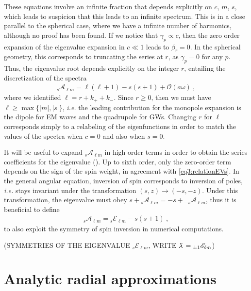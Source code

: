 These equations involve an infinite fraction that depends explicitly on $c$, $m$, $s$, which leads to suspicion that this leads to an infinite spectrum.
This is in a close parallel to the spherical case, where we have a infinite number of harmonics, although no proof has been found.
If we notice that $\gamma_p\propto c$, then the zero order expansion of the eigenvalue expansion in $c\ll 1$ leads to $\beta_r=0$.
In the spherical geometry, this corresponds to truncating the series at $r$, as $\gamma_p=0$ for any $p$. Thus, the eigenvalue root depends explicitly on the integer $r$, entailing the discretization of the spectra
\begin{align}
    \label{eq3:evSWSH0th}
    {}_{s}\mathscr{A}_{\ell m} = \ell(\ell+1) - s(s+1) + \mathscr{O}(a\omega)~,
\end{align}
where we identified $\ell=r+k_{+}+k_{-}$.
Since $r\ge 0$, then we must have $\ell\ge\max\{|m|,|s|\}$, \emph{i.e.} the leading contribution for the monopole expansion is the dipole for EM waves and the quadrupole for GWs. 
Changing $r$ for $\ell$ corresponds simply to a relabeling of the eigenfunctions in order to match the values of the spectra when $c=0$ and also when $s=0$.

It will be useful to expand ${}_{s}\mathscr{A}_{\ell m}$ in high order terms in order to obtain the series coefficients for the eigenvalue ().
Up to sixth order, only the zero-order term depends on the sign of the spin weight, in agreement with \eqref{eq3:relationEVs}.
In the general angular equation, inversion of spin corresponds to inversion of poles, \emph{i.e.} stays invariant under the transformation $(s,z)\to(-s,-z)$.
Under this transformation, the eigenvalue must obey $s+ {}_{s}\mathscr{A}_{\ell m} = -s + {}_{-s}\mathscr{A}_{\ell m}$, thus it is beneficial to define 
\begin{align}
    \label{eq3:sElm}
    {}_{s}\mathscr{A}_{\ell m} = {}_{s}\mathscr{E}_{\ell m} - s(s+1) ~,
\end{align}
to also exploit the symmetry of spin inversion in numerical computations.

(SYMMETRIES OF THE EIGENVALUE ${}_{s}\mathscr{E}_{\ell m}$, WRITE $\lambdabar={}_{\pm1}\mathscr{E}_{\ell m}$)


\section{Analytic radial approximations}


